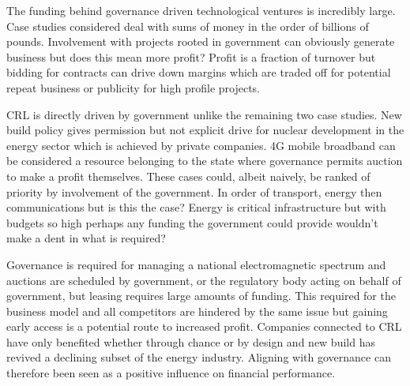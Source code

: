 {}

The funding behind governance driven technological ventures is incredibly large.
Case studies considered deal with sums of money in the order of billions of pounds.
Involvement with projects rooted in government can obviously generate business but does this mean more profit?
Profit is a fraction of turnover but bidding for contracts can drive down margins which are traded off for potential repeat business or publicity for high profile projects.  

CRL is directly driven by government unlike the remaining two case studies.
New build policy gives permission but not explicit drive for nuclear development in the energy sector which is achieved by private companies.
4G mobile broadband can be considered a resource belonging to the state where governance permits auction to make a profit themselves.
These cases could, albeit naively, be ranked of priority by involvement of the government.
In order of transport, energy then communications but is this the case?
Energy is critical infrastructure but with budgets so high perhaps any funding the government could provide wouldn't make a dent in what is required?

Governance is required for managing a national electromagnetic spectrum and auctions are scheduled by government, or the regulatory body acting on behalf of government, but leasing requires large amounts of funding.
This required for the business model and all competitors are hindered by the same issue but gaining early access is a potential route to increased profit.
Companies connected to CRL have only benefited whether through chance or by design and new build has revived a declining subset of the energy industry.
Aligning with governance can therefore been seen as a positive influence on financial performance.
